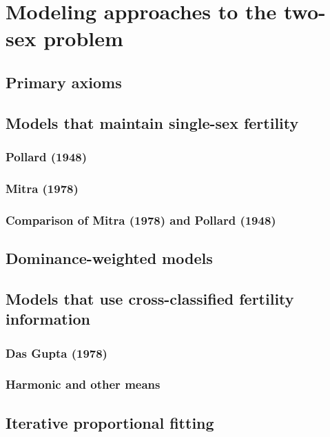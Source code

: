   \chapter{Modeling approaches to the two-sex problem}
    
    \section{Primary axioms}
      
    \section{Models that maintain single-sex fertility}
      \subsection{Pollard (1948)}
       
      \subsection{Mitra (1978)}
        
      \subsection{Comparison of Mitra (1978) and Pollard (1948)}
       
  \section{Dominance-weighted models}
     
  \section{Models that use cross-classified fertility information}
     \subsection{Das Gupta (1978)}
       
     \subsection{Harmonic and other means}
       
     

  \section{Iterative proportional fitting}
      
